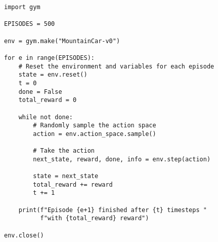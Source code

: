 \begin{lstlisting}[style=codestyle, basicstyle=\ttfamily\footnotesize, caption={Using OpenAI Gym with the Mountain Car environment}, label=lst:mountain_car_environment]
import gym

EPISODES = 500

env = gym.make("MountainCar-v0")

for e in range(EPISODES):
    # Reset the environment and variables for each episode
    state = env.reset()
    t = 0
    done = False
    total_reward = 0

    while not done:
        # Randomly sample the action space
        action = env.action_space.sample()

        # Take the action
        next_state, reward, done, info = env.step(action)

        state = next_state
        total_reward += reward
        t += 1

    print(f"Episode {e+1} finished after {t} timesteps "
          f"with {total_reward} reward")

env.close()
\end{lstlisting}

